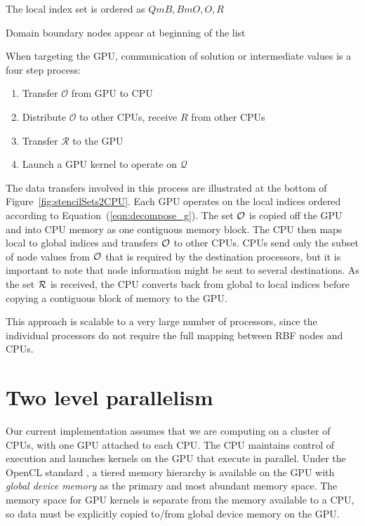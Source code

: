 \authnote{} The local index set is ordered as ${QmB, BmO, O, R}$ 

\authnote{} Domain boundary nodes appear at beginning of the list 


When targeting the GPU, communication of solution or intermediate values is a four step process:
        \begin{enumerate}
    \item Transfer $\mathcal{O}$ from GPU to CPU
	\item Distribute $\mathcal{O}$ to other CPUs, receive $R$ from other CPUs
	\item Transfer $\mathcal{R}$ to the GPU
	\item Launch a GPU kernel to operate on $\mathcal{Q}$
     \end{enumerate} 
The data transfers involved in this process are illustrated at the bottom of Figure~\ref{fig:stencilSets2CPU}.
    Each GPU operates on the local indices ordered 
according to Equation~(\ref{eqn:decompose_g}). The set 
$\mathcal{O}$ is copied off the GPU and into CPU memory as one contiguous memory block. The CPU then maps local to global indices and transfers $\mathcal{O}$ to other CPUs. CPUs send only the subset of node values from $\mathcal{O}$ that is required by the destination processors, but it is important to note that node information might be sent to several destinations. 
As the set $\mathcal{R}$ is received, the CPU converts back from global to local indices before copying a contiguous block of memory to the GPU. 

        This approach is scalable to a very large number of 
		processors, since the individual processors do not require the 
		full mapping between RBF nodes and CPUs. 



\section{Two level parallelism}

Our current implementation assumes that we are computing on a cluster of CPUs,
with one GPU attached to each CPU. The CPU maintains control of execution and
launches kernels on the GPU that execute in parallel. Under the OpenCL standard
\cite{OpenCL2009}, a tiered memory hierarchy is available on the GPU with
\textit{global device memory} as the primary and most abundant memory space.
The memory space for GPU kernels is separate from the memory available to a
CPU, so data must be explicitly copied to/from global device memory on the GPU. 

